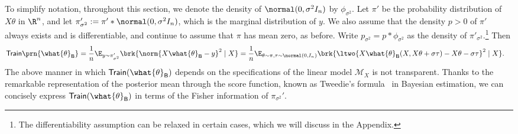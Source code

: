\documentclass[11pt]{article}
\newcommand{\bysest}{\what{\theta}_{\mathsf{B}}}
\newcommand{\trerr}{\mathsf{Train}}
\newcommand{\model}{\mathscr{M}}
\newcommand{\de}{\mathrm{d}}
\begin{document}
To simplify notation, throughout this section, we denote the density of $\normal(0, \sigma^2 I_n)$ by $\phi_{\sigma^2}$. Let $\pi'$ be the probability distribution of $X\theta$ in $\R^n$, and let $\pi'_{\sigma^2} := \pi'*\normal(0, \sigma^2 I_n)$, which is the marginal distribution of $y$. We also assume that the density $p > 0$ of $\pi'$ always exists and is differentiable, and continue to assume that $\pi$ has mean zero, as before. Write $p_{\sigma^2} = p\ast \phi_{\sigma^2}$ as the density of $\pi'_{\sigma^2}$.\footnote{The differentiability assumption can be relaxed in certain cases, which we will discuss in the Appendix.}  Then
\begin{align*}
    \trerr\prn{\bysest} & = \frac{1}{n}\E_{y \sim \pi'_{\sigma^2}} \brk{\norm{X \bysest - y}^2 \mid X} = \frac{1}{n}\E_{\theta \sim \pi, \tau \sim \normal(0, I_n)} \brk{\ltwo{X \bysest(X, X\theta + \sigma \tau) - X \theta - \sigma \tau}^2 \mid X}.
\end{align*}
The above manner in which $\trerr(\bysest)$ depends on the specifications of the linear model $\model_X$ is not transparent. Thanks to the remarkable representation of the posterior mean through the score function, known as Tweedie’s formula~\citep{efron2011tweedie} in Bayesian estimation, we can concisely express $\trerr(\bysest)$ in terms of the Fisher information of $\pi_{\sigma^2}'$.
\end{document}
